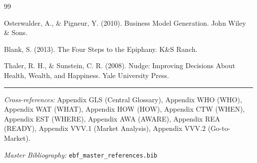 \begin{thebibliography}{99}

 Osterwalder, A., \& Pigneur, Y. (2010). Business Model Generation. John Wiley \& Sons.

 Blank, S. (2013). The Four Steps to the Epiphany. K\&S Ranch.

 Thaler, R. H., \& Sunstein, C. R. (2008). Nudge: Improving Decisions About Health, Wealth, and Happiness. Yale University Press.

\end{thebibliography}



\vspace{1em}
\hrule
\vspace{0.5em}

\noindent\textit{Cross-references:}
Appendix GLS (Central Glossary),
Appendix WHO (WHO),
Appendix WAT (WHAT),
Appendix HOW (HOW),
Appendix CTW (WHEN),
Appendix EST (WHERE),
Appendix AWA (AWARE),
Appendix REA (READY),
Appendix VVV.1 (Market Analysis),
Appendix VVV.2 (Go-to-Market).

\noindent\textit{Master Bibliography:} \texttt{ebf\_master\_references.bib}

